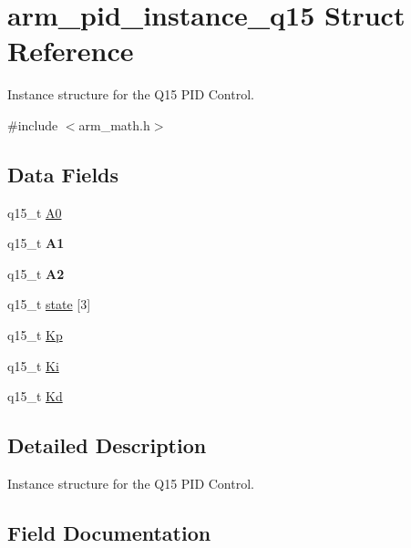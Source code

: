 \hypertarget{structarm__pid__instance__q15}{}\section{arm\+\_\+pid\+\_\+instance\+\_\+q15 Struct Reference}
\label{structarm__pid__instance__q15}


Instance structure for the Q15 P\+ID Control.  




{\ttfamily \#include $<$arm\+\_\+math.\+h$>$}

\subsection*{Data Fields}
\begin{DoxyCompactItemize}
\item 
q15\+\_\+t \mbox{\hyperlink{structarm__pid__instance__q15_a1aa73268c65cea0c7bc66bb70ff35205}{A0}}
\item 
\mbox{\label{structarm__pid__instance__q15_af66ed2ba68c67c1cac2c37cc902bb386}} 
q15\+\_\+t {\bfseries A1}
\item 
\mbox{\label{structarm__pid__instance__q15_a06ee5d86e97bf48a15096806b79f299c}} 
q15\+\_\+t {\bfseries A2}
\item 
q15\+\_\+t \mbox{\hyperlink{structarm__pid__instance__q15_a4c4e19d77015f5f7a31a1daf0faf31b6}{state}} \mbox{[}3\mbox{]}
\item 
q15\+\_\+t \mbox{\hyperlink{structarm__pid__instance__q15_afef61fb3b64c73f2cd0c91d9dcf95679}{Kp}}
\item 
q15\+\_\+t \mbox{\hyperlink{structarm__pid__instance__q15_a19d5059baf06dd52266260d096702d0a}{Ki}}
\item 
q15\+\_\+t \mbox{\hyperlink{structarm__pid__instance__q15_abf38d18de1e16bc6d86846fedf8534fe}{Kd}}
\end{DoxyCompactItemize}


\subsection{Detailed Description}
Instance structure for the Q15 P\+ID Control. 

\subsection{Field Documentation}
\mbox{\label{structarm__pid__instance__q15_a1aa73268c65cea0c7bc66bb70ff35205}} 
